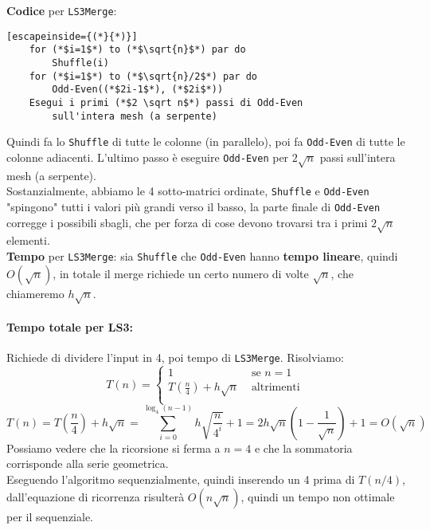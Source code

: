 \textbf{Codice} per \texttt{LS3Merge}:
\begin{lstlisting}[escapeinside={(*}{*)}]
	for (*$i=1$*) to (*$\sqrt{n}$*) par do
		Shuffle(i)
	for (*$i=1$*) to (*$\sqrt{n}/2$*) par do
		Odd-Even((*$2i-1$*), (*$2i$*))
	Esegui i primi (*$2 \sqrt n$*) passi di Odd-Even 
		sull'intera mesh (a serpente)
\end{lstlisting}

Quindi fa lo \texttt{Shuffle} di tutte le colonne (in parallelo), poi fa \texttt{Odd-Even} di tutte le colonne adiacenti. L'ultimo passo è eseguire \texttt{Odd-Even} per $2\sqrt{n}$ passi sull'intera mesh (a serpente).\\

Sostanzialmente, abbiamo le 4 sotto-matrici ordinate, \texttt{Shuffle} e \texttt{Odd-Even} "spingono" tutti i valori più grandi verso il basso, la parte finale di \texttt{Odd-Even} corregge i possibili sbagli, che per forza di cose devono trovarsi tra i primi $2 \sqrt{n}$ elementi.\\

\textbf{Tempo} per \texttt{LS3Merge}: sia \texttt{Shuffle} che \texttt{Odd-Even} hanno \textbf{tempo lineare}, quindi $O (\sqrt{n})$, in totale il merge richiede un certo numero di volte $\sqrt{n}$, che chiameremo $h \sqrt{n}$.\\

\newpage

\paragraph{Tempo totale per LS3:} Richiede di dividere l'input in 4, poi tempo di \texttt{LS3Merge}. Risolviamo: 
$$ T(n) = \begin{cases}
	1 & \text{ se } n= 1\\
	T\left(\frac{n}{4}\right) + h \sqrt{n} & \text{ altrimenti } \\
\end{cases}$$
$$ T(n) = T\left(\frac{n}{4}\right) + h \sqrt{n} = \sum_{i=0}^{\log_4 (n-1)} h \sqrt{\frac{n}{4^i}} + 1 = 2 h \sqrt{n} \left(1 - \frac{1}{\sqrt{n}}\right) + 1 = O (\sqrt{n}) $$
Possiamo vedere che la ricorsione si ferma a $n=4$ e che la sommatoria corrisponde alla serie geometrica.\\

Eseguendo l'algoritmo sequenzialmente, quindi inserendo un 4 prima di $T(n/4)$, dall'equazione di ricorrenza risulterà $O(n\sqrt{n})$, quindi un tempo non ottimale per il sequenziale.\\


